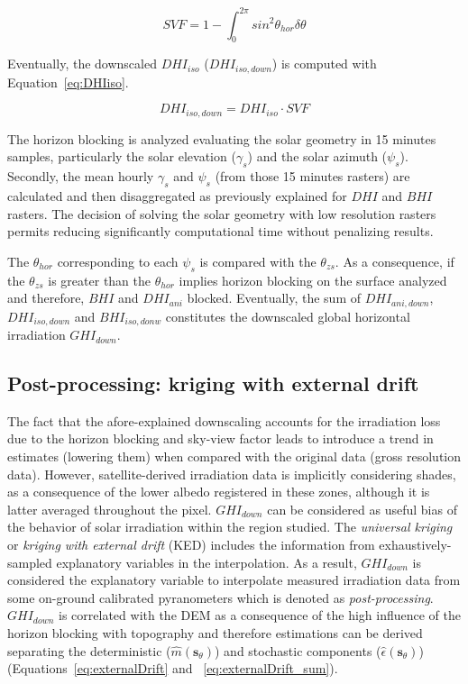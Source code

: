 \documentclass[article]{jss}
\begin{document}
\begin{equation}
  \label{eq:SVF}
  SVF=1-\int_0^{2\pi}sin^{2} \theta_{hor} \delta \theta
\end{equation}

Eventually, the downscaled $DHI_{iso}$ ($DHI_{iso,down}$) is
computed with Equation~\ref{eq:DHIiso}.

\begin{equation}
  \label{eq:DHIiso}
  DHI_{iso,down}=DHI_{iso}\cdot{}SVF
\end{equation}

The horizon blocking is analyzed evaluating the solar geometry in
15 minutes samples, particularly the solar elevation
($\gamma_{s}$) and the solar azimuth ($\psi_{s}$). Secondly, the
mean hourly $\gamma_{s}$ and $\psi_{s}$ (from those 15 minutes
rasters) are calculated and then disaggregated as previously
explained for $DHI$ and $BHI$ rasters. The decision of solving the
solar geometry with low resolution rasters permits reducing
significantly computational time without penalizing results.

The $\theta_{hor}$ corresponding to each $\psi_{s}$ is compared
with the $\theta_{zs}$. As a consequence, if the $\theta_{zs}$ is
greater than the $\theta_{hor}$ implies horizon blocking on the
surface analyzed and therefore, $BHI$ and $DHI_{ani}$
blocked. Eventually, the sum of $DHI_{ani,down}$, $DHI_{iso,down}$
and $BHI_{iso,donw}$ constitutes the downscaled global horizontal
irradiation $GHI_{down}$.

\subsection{Post-processing: kriging with external drift}
\label{sec:meth}
The fact that the afore-explained downscaling accounts for the
irradiation loss due to the horizon blocking and sky-view factor
leads to introduce a trend in estimates (lowering them) when
compared with the original data (gross resolution data). However,
satellite-derived irradiation data is implicitly considering
shades, as a consequence of the lower albedo registered in these
zones, although it is latter averaged throughout the
pixel. $GHI_{down}$ can be considered as useful bias of the
behavior of solar irradiation within the region studied. The
\emph{universal kriging} or \emph{kriging with external drift}
(KED) includes the information from exhaustively-sampled
explanatory variables in the interpolation. As a result,
$GHI_{down}$ is considered the explanatory variable to interpolate
measured irradiation data from some on-ground calibrated
pyranometers which is denoted as
\emph{post-processing}. $GHI_{down}$ is correlated with the DEM as
a consequence of the high influence of the horizon blocking with
topography and therefore estimations can be derived separating the
deterministic ($\hat{m}(\mathbf{s}_\theta)$) and stochastic
components ($\hat{\epsilon}(\mathbf{s}_\theta)$)
(Equations~\ref{eq:externalDrift} and
~\ref{eq:externalDrift_sum}).
\end{document}
